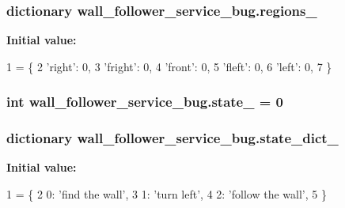 \subsubsection[{\texorpdfstring{regions\+\_\+}{regions_}}]{\setlength{\rightskip}{0pt plus 5cm}dictionary wall\+\_\+follower\+\_\+service\+\_\+bug.\+regions\+\_\+}\hypertarget{namespacewall__follower__service__bug_a17a692ba0d421dab426bc6232daed99e}{}\label{namespacewall__follower__service__bug_a17a692ba0d421dab426bc6232daed99e}
{\bfseries Initial value\+:}
\begin{DoxyCode}
1 = \{
2     \textcolor{stringliteral}{'right'}: 0,
3     \textcolor{stringliteral}{'fright'}: 0,
4     \textcolor{stringliteral}{'front'}: 0,
5     \textcolor{stringliteral}{'fleft'}: 0,
6     \textcolor{stringliteral}{'left'}: 0,
7 \}
\end{DoxyCode}
\subsubsection[{\texorpdfstring{state\+\_\+}{state_}}]{\setlength{\rightskip}{0pt plus 5cm}int wall\+\_\+follower\+\_\+service\+\_\+bug.\+state\+\_\+ = 0}\hypertarget{namespacewall__follower__service__bug_a96d928f6c8413cb0f1138c187ca0206a}{}\label{namespacewall__follower__service__bug_a96d928f6c8413cb0f1138c187ca0206a}
\subsubsection[{\texorpdfstring{state\+\_\+dict\+\_\+}{state_dict_}}]{\setlength{\rightskip}{0pt plus 5cm}dictionary wall\+\_\+follower\+\_\+service\+\_\+bug.\+state\+\_\+dict\+\_\+}\hypertarget{namespacewall__follower__service__bug_a4559f30e607293b76c468006cf83eaa3}{}\label{namespacewall__follower__service__bug_a4559f30e607293b76c468006cf83eaa3}
{\bfseries Initial value\+:}
\begin{DoxyCode}
1 = \{
2     0: \textcolor{stringliteral}{'find the wall'},
3     1: \textcolor{stringliteral}{'turn left'},
4     2: \textcolor{stringliteral}{'follow the wall'},
5 \}
\end{DoxyCode}
